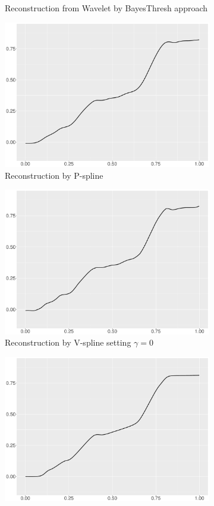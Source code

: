 \begin{figure}
\begin{subfigure}{0.45\textwidth}
    \caption{Reconstruction from Wavelet by BayesThresh approach}
    \end{subfigure}
    \begin{subfigure}{0.45\textwidth}
    \centering
    \includegraphics[width=\linewidth,height=0.45\textwidth]{Chapters/02TractorSplineTheory/plot/ggplot/ggBlocksPSpline.pdf}
    \caption{Reconstruction by P-spline  }
    \end{subfigure}
    \begin{subfigure}{0.45\textwidth}
    \centering
    \includegraphics[width=\linewidth,height=0.45\textwidth]{Chapters/02TractorSplineTheory/plot/ggplot/ggBlocksGamma.pdf}
    \caption{Reconstruction by V-spline setting $\gamma=0$}
    \end{subfigure}
  \begin{subfigure}{0.45\textwidth}
    \centering
    \includegraphics[width=\linewidth,height=0.45\textwidth]{Chapters/02TractorSplineTheory/plot/ggplot/ggBlocksTractorAPT.pdf}

\end{subfigure}
\end{figure}
